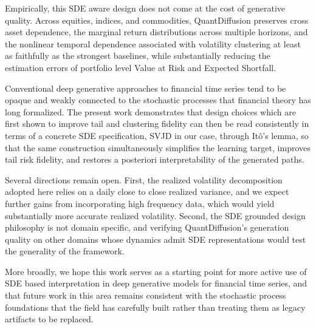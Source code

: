 \documentclass[sigconf,natbib=false]{acmart}
\begin{document}
Empirically, this SDE aware design does not come at the cost of generative quality. Across equities, indices, and commodities, QuantDiffusion preserves cross asset dependence, the marginal return distributions across multiple horizons, and the nonlinear temporal dependence associated with volatility clustering at least as faithfully as the strongest baselines, while substantially reducing the estimation errors of portfolio level Value at Risk and Expected Shortfall.

Conventional deep generative approaches to financial time series tend to be opaque and weakly connected to the stochastic processes that financial theory has long formalized. The present work demonstrates that design choices which are first shown to improve tail and clustering fidelity can then be read consistently in terms of a concrete SDE specification, SVJD in our case, through It\^{o}'s lemma, so that the same construction simultaneously simplifies the learning target, improves tail risk fidelity, and restores a posteriori interpretability of the generated paths.

Several directions remain open. First, the realized volatility decomposition adopted here relies on a daily close to close realized variance, and we expect further gains from incorporating high frequency data, which would yield substantially more accurate realized volatility. Second, the SDE grounded design philosophy is not domain specific, and verifying QuantDiffusion's generation quality on other domains whose dynamics admit SDE representations would test the generality of the framework.

More broadly, we hope this work serves as a starting point for more active use of SDE based interpretation in deep generative models for financial time series, and that future work in this area remains consistent with the stochastic process foundations that the field has carefully built rather than treating them as legacy artifacts to be replaced.

\printbibliography
\end{document}
